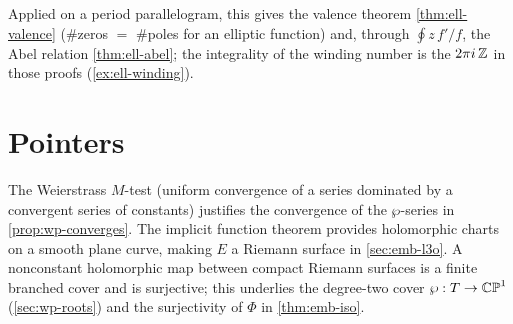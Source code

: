 Applied on a period parallelogram, this gives the valence theorem
\cref{thm:ell-valence} (\#zeros \(=\) \#poles for an elliptic function) and,
through \(\oint z\,f'/f\), the Abel relation \cref{thm:ell-abel}; the integrality
of the winding number is the \(2\pi i\,\mathbb{Z}\) in those proofs
(\cref{ex:ell-winding}).

\section{Pointers}
\label{sec:A-pointers}

The Weierstrass \(M\)-test (uniform convergence of a series dominated by a
convergent series of constants) justifies the convergence of the \(\wp\)-series in
\cref{prop:wp-converges}. The implicit function theorem provides holomorphic charts
on a smooth plane curve, making \(E\) a Riemann surface in \cref{sec:emb-l3o}. A
nonconstant holomorphic map between compact Riemann surfaces is a finite branched
cover and is surjective; this underlies the degree-two cover \(\wp : T \to \mathbb{CP}^1\)
(\cref{sec:wp-roots}) and the surjectivity of \(\Phi\) in \cref{thm:emb-iso}.

